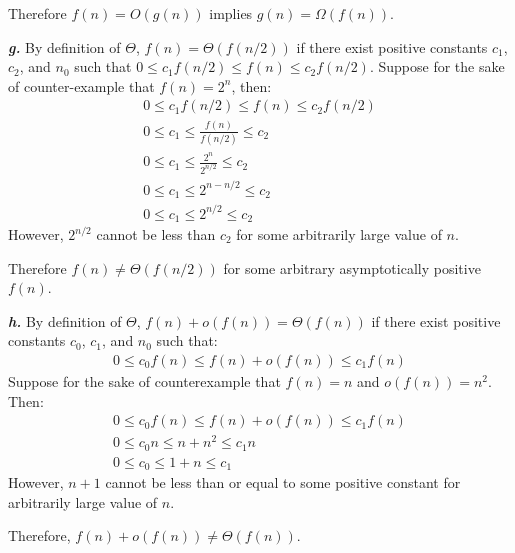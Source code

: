 \documentclass{article}
\begin{document}
Therefore $f(n) = O(g(n))$ implies $g(n) = \Omega(f(n))$.

\noindent\textbf{\textit{g.}} By definition of $\Theta$, $f(n) = \Theta(f(n/2))$ if there exist positive constants $c_1$, $c_2$, and $n_0$ such that $0 \leq c_1 f(n/2) \leq f(n) \leq c_2 f(n/2)$. Suppose for the sake of counter-example that $f(n) = 2^n$, then:
\begin{eqnarray*}
	0 \leq c_1 f(n/2) \leq f(n) \leq c_2 f(n/2) \\
	0 \leq c_1 \leq \frac{f(n)}{f(n/2)} \leq c_2 \\
	0 \leq c_1 \leq \frac{2^n}{2^{n/2}} \leq c_2 \\
	0 \leq c_1 \leq 2^{n - n/2} \leq c_2 \\
	0 \leq c_1 \leq 2^{n/2} \leq c_2
\end{eqnarray*}
However, $2^{n/2}$ cannot be less than $c_2$ for some arbitrarily large value of $n$.

Therefore $f(n) \neq \Theta(f(n/2))$ for some arbitrary asymptotically positive $f(n)$.

\noindent\textbf{\textit{h.}} By definition of $\Theta$, $f(n) + o(f(n)) = \Theta(f(n))$ if there exist positive constants $c_0$, $c_1$, and $n_0$ such that:
\begin{eqnarray*}
	0 \leq c_0 f(n) \leq f(n) + o(f(n)) \leq c_1 f(n)
\end{eqnarray*}
Suppose for the sake of counterexample that $f(n) = n$ and $o(f(n)) = n^2$. Then:
\begin{eqnarray*}
	0 \leq c_0 f(n) \leq f(n) + o(f(n)) \leq c_1 f(n) \\
	0 \leq c_0 n \leq n + n^2 \leq c_1 n \\
	0 \leq c_0 \leq 1 + n \leq c_1
\end{eqnarray*}
However, $n + 1$ cannot be less than or equal to some positive constant for arbitrarily large value of $n$.

Therefore, $f(n) + o(f(n)) \neq \Theta(f(n))$.
\end{document}

